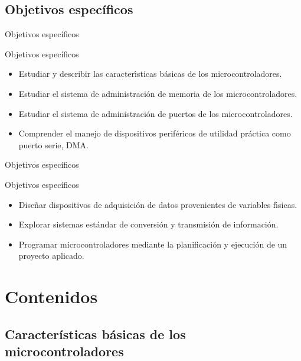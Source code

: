 \documentclass[xcolor=dvipsnames,handout]{beamer}
\newcommand{\pageframe}[1]{\frame{\begin{center}{ \Huge #1 }\end{center}}}
\begin{document}
\subsection{Objetivos específicos}

\begin{frame}{Objetivos específicos}
  \begin{block}{Objetivos específicos}
    \begin{itemize}
      \item<1> Estudiar y describir las caracter\'\i sticas b\'asicas de los microcontroladores.
      \item<1> Estudiar el sistema de administraci\'on de memoria de los microcontroladores.
      \item<1> Estudiar el sistema de administraci\'on de puertos de los microcontroladores.
      \item<1> Comprender el manejo de dispositivos perif\'ericos de utilidad pr\'actica como puerto serie, DMA.
    \end{itemize}
  \end{block}
\end{frame}
\begin{frame}{Objetivos específicos}
  \begin{block}{Objetivos específicos}
    \begin{itemize}
      \item Dise\~nar dispositivos de adquisici\'on de datos provenientes de variables f\'\i sicas.
      \item Explorar sistemas est\'andar de conversi\'on y transmisi\'on de informaci\'on.
      \item Programar microcontroladores mediante la planificaci\'on y ejecuci\'on de un proyecto aplicado.
    \end{itemize}
  \end{block}
\end{frame}

\section{Contenidos}

\pageframe{Contenidos}

\subsection[Características]{Características básicas de los microcontroladores}
\end{document}
